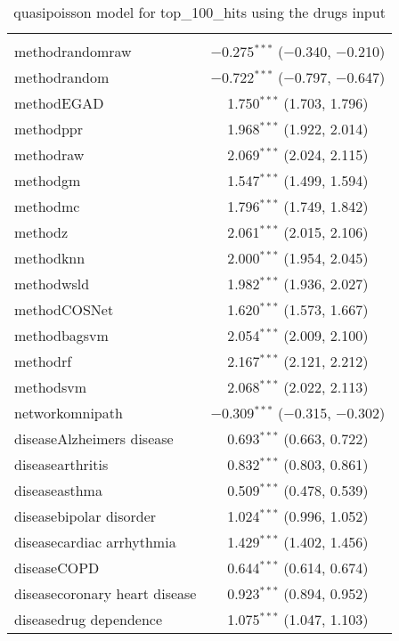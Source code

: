 
\begin{table}[!htbp] \centering 
  \caption{quasipoisson model for top_100_hits using the drugs input} 
  \label{} 
\begin{tabular}{@{\extracolsep{5pt}}lc} 
\\[-1.8ex]\hline 
\hline \\[-1.8ex] 
 methodrandomraw & $-$0.275$^{***}$ ($-$0.340, $-$0.210) \\ 
  methodrandom & $-$0.722$^{***}$ ($-$0.797, $-$0.647) \\ 
  methodEGAD & 1.750$^{***}$ (1.703, 1.796) \\ 
  methodppr & 1.968$^{***}$ (1.922, 2.014) \\ 
  methodraw & 2.069$^{***}$ (2.024, 2.115) \\ 
  methodgm & 1.547$^{***}$ (1.499, 1.594) \\ 
  methodmc & 1.796$^{***}$ (1.749, 1.842) \\ 
  methodz & 2.061$^{***}$ (2.015, 2.106) \\ 
  methodknn & 2.000$^{***}$ (1.954, 2.045) \\ 
  methodwsld & 1.982$^{***}$ (1.936, 2.027) \\ 
  methodCOSNet & 1.620$^{***}$ (1.573, 1.667) \\ 
  methodbagsvm & 2.054$^{***}$ (2.009, 2.100) \\ 
  methodrf & 2.167$^{***}$ (2.121, 2.212) \\ 
  methodsvm & 2.068$^{***}$ (2.022, 2.113) \\ 
  networkomnipath & $-$0.309$^{***}$ ($-$0.315, $-$0.302) \\ 
  diseaseAlzheimers disease & 0.693$^{***}$ (0.663, 0.722) \\ 
  diseasearthritis & 0.832$^{***}$ (0.803, 0.861) \\ 
  diseaseasthma & 0.509$^{***}$ (0.478, 0.539) \\ 
  diseasebipolar disorder & 1.024$^{***}$ (0.996, 1.052) \\ 
  diseasecardiac arrhythmia & 1.429$^{***}$ (1.402, 1.456) \\ 
  diseaseCOPD & 0.644$^{***}$ (0.614, 0.674) \\ 
  diseasecoronary heart disease & 0.923$^{***}$ (0.894, 0.952) \\ 
  diseasedrug dependence & 1.075$^{***}$ (1.047, 1.103) \\ 

\end{tabular}
\end{table}
